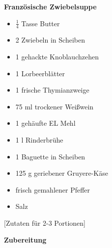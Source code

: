 
\parindent0pt	

\pagestyle{empty}


\textbf{{\LARGE Französische Zwiebelsuppe}}%

\hrulefill
\vspace*{\fill}
\begin{multicols}{2}	


\begin{itemize}
\item $\frac{1}{4}$ Tasse Butter
\item 2 Zwiebeln in Scheiben
\item 1 gehackte Knoblauchzehen
\item 1 Lorbeerblätter
\item 1 frische Thymianzweige
\item 75 ml trockener Weißwein
\item 1 gehäufte EL Mehl	
\item 1 l Rinderbrühe
\item 1 Baguette in Scheiben
\item 125 g geriebener Gruyere-Käse
\item frisch gemahlener Pfeffer
\item Salz 

\end{itemize}

\end{multicols}

\vspace{2cm}
\begin{center}
[Zutaten für 2-3 Portionen]
\end{center}

\vfill
\newpage
\textbf{{\LARGE Zubereitung}}%

\hrulefill

